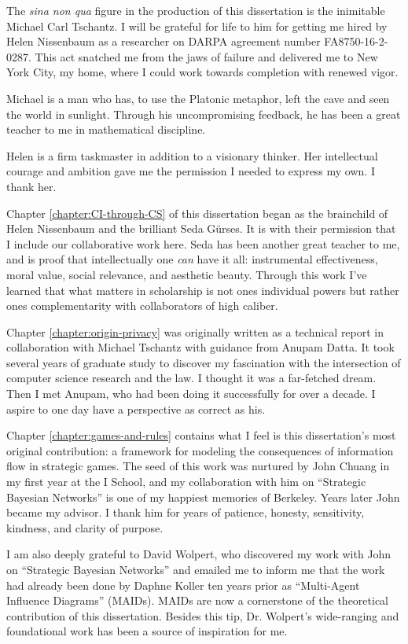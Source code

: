 \documentclass[../thesis.tex]{subfiles}
\begin{document}
 The \textit{sina non qua} figure in the production of
 this dissertation is the inimitable Michael Carl Tschantz.
 I will be grateful for life to him for getting me hired by
 Helen Nissenbaum as a researcher on DARPA agreement number FA8750-16-2-0287.
 This act snatched me from the jaws of failure and delivered me
 to New York City, my home, where I could work towards completion with renewed vigor.

 Michael is a man who has, to use the Platonic metaphor,
 left the cave and seen the world in sunlight.
 Through his uncompromising feedback, he has been a
 great teacher to me in mathematical discipline.

 Helen is a firm taskmaster in addition to a visionary thinker.
 Her intellectual courage and ambition gave me the permission I needed to express my own.
 I thank her.
 
 Chapter \ref{chapter:CI-through-CS} of this dissertation began as the brainchild
 of Helen Nissenbaum and the brilliant Seda G{\"u}rses.
 It is with their permission that I include our collaborative work here.
 Seda has been another great teacher to me,
 and is proof that intellectually
 one \textit{can} have it all:
 instrumental effectiveness, moral value, social relevance,
 and aesthetic beauty.
 Through this work I've learned that what matters in
 scholarship is not ones individual powers but rather
 ones complementarity with collaborators of high caliber.

 Chapter \ref{chapter:origin-privacy} was originally written
 as a technical report in collaboration with Michael Tschantz
 with guidance from Anupam Datta.
 It took several years of graduate study to discover my
 fascination with the intersection of computer science
 research and the law.
 I thought it was a far-fetched dream.
 Then I met Anupam,
 who had been doing it successfully for over a decade.
 I aspire to one day have a perspective as correct as his.

 Chapter \ref{chapter:games-and-rules} contains what I feel
 is this dissertation's most original contribution:
 a framework for modeling the consequences of information flow
 in strategic games.
 The seed of this work was nurtured by John Chuang
 in my first year at the I School, and my collaboration
 with him on ``Strategic Bayesian Networks'' is one of
 my happiest memories of Berkeley.
 Years later John became my advisor.
 I thank him for years of patience, honesty, sensitivity,
 kindness, and clarity of purpose.

 I am also deeply grateful to David Wolpert, who discovered
 my work with John on ``Strategic Bayesian Networks''
 and emailed me to inform me that the work had already
 been done by Daphne Koller ten years prior as
 ``Multi-Agent Influence Diagrams'' (MAIDs).
  MAIDs are now a cornerstone of the theoretical contribution
 of this dissertation.
 Besides this tip, Dr. Wolpert's wide-ranging and foundational
 work has been a source of inspiration for me.
 
\end{document}
